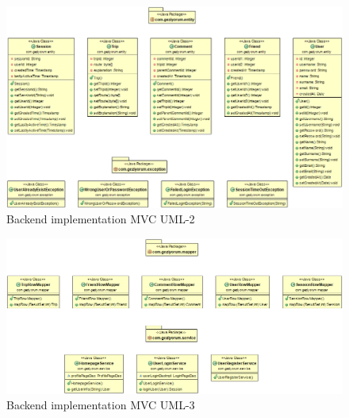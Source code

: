 \begin{figure}[!htbp]
\centering
\includegraphics[width=\textwidth]{projectChapters/images/backend2.png}
\caption{Backend implementation MVC UML-2}
\end{figure}


\begin{figure}[!htbp]
\centering
\includegraphics[width=\textwidth]{projectChapters/images/backend3.png}
\caption{Backend implementation MVC UML-3}
\end{figure} 
 
 